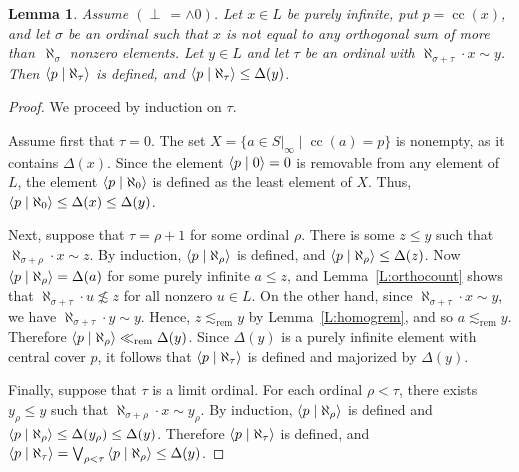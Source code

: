 \documentclass[psamsfonts,reqno]{memo-l}
\theoremstyle{plain}
\newtheorem{lemma}{Lemma}[section]
\theoremstyle{definition}
\theoremstyle{remark}
\numberwithin{equation}{section}
\newcommand{\rem}{\ll_{\mathrm{rem}}}
\newcommand{\srem}{\lesssim_{\mathrm{rem}}}
\newcommand{\scal}[2]{\left\langle\nobreak#1\nobreak\mid\nobreak#2
\nobreak\right\rangle}
\DeclareMathOperator{\cc}{cc}
\newcommand{\set}[1]{\{#1\}}
\newcommand{\setm}[2]{\set{#1\mid#2}}
\begin{document}
\begin{lemma}\label{L:largedelta}
Assume $(\perp\,=\wedge0)$. Let $x\in L$ be purely infinite,
put $p=\cc(x)$, and let $\sigma$ be an ordinal such that $x$ is not equal to
any orthogonal sum of more than~$\aleph_\sigma$ nonzero
elements. Let $y\in L$ and let $\tau$ be an ordinal with
$\aleph_{\sigma+\tau}\cdot x\sim y$. Then $\scal{p}{\aleph_\tau}$
is defined, and $\scal{p}{\aleph_\tau}\leq\Delta(y)$.
\end{lemma}

\begin{proof} We proceed by induction on $\tau$.

Assume first that $\tau=0$. The set $X=\setm{a\in S|_\infty}{\cc(a)=p}$ is
nonempty, as it contains $\Delta(x)$. Since the element $\scal{p}{0}=0$ is
removable from any element of $L$, the element $\scal{p}{\aleph_0}$ is
defined as the least element of
$X$. Thus, $\scal{p}{\aleph_0}\leq\Delta(x)\leq\Delta(y)$.

Next, suppose that $\tau=\rho+1$ for some ordinal $\rho$. There is
some $z\leq y$ such that $\aleph_{\sigma+\rho}\cdot x\sim z$. By
induction, $\scal{p}{\aleph_\rho}$ is defined, and
$\scal{p}{\aleph_\rho}\leq\Delta(z)$. Now $\scal{p}{\aleph_\rho}=
\Delta(a)$ for some purely infinite $a\leq z$, and Lemma~\ref{L:orthocount}
shows that $\aleph_{\sigma+\tau}\cdot u\not\lesssim z$ for all nonzero $u\in
L$. On the other hand, since $\aleph_{\sigma+\tau}\cdot x\sim y$, we have
$\aleph_{\sigma+\tau}\cdot y\sim y$. Hence, $z\srem y$ by
Lemma~\ref{L:homogrem}, and so $a\srem y$. Therefore
$\scal{p}{\aleph_\rho} \rem \Delta(y)$. Since $\Delta(y)$ is a
purely infinite element with central cover $p$, it follows that
$\scal{p}{\aleph_\tau}$ is defined and majorized by $\Delta(y)$.

Finally, suppose that $\tau$ is a limit ordinal. For each ordinal
$\rho<\tau$, there exists $y_\rho\leq y$ such that
$\aleph_{\sigma+\rho}\cdot x\sim y_\rho$. By induction,
$\scal{p}{\aleph_\rho}$ is defined and $\scal{p}{\aleph_\rho}\leq
\Delta(y_\rho)\leq\Delta(y)$. Therefore $\scal{p}{\aleph_\tau}$ is defined,
and $\scal{p}{\aleph_\tau}= \bigvee_{\rho<\tau}
\scal{p}{\aleph_\rho}\leq\Delta(y)$.
\end{proof}
\end{document}
